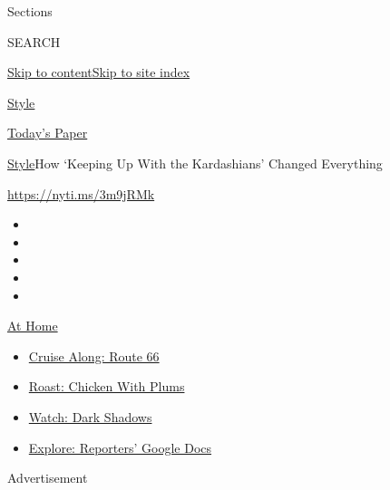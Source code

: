 Sections

SEARCH

\protect\hyperlink{site-content}{Skip to
content}\protect\hyperlink{site-index}{Skip to site index}

\href{https://www.nytimes3xbfgragh.onion/section/style}{Style}

\href{https://myaccount.nytimes3xbfgragh.onion/auth/login?response_type=cookie\&client_id=vi}{}

\href{https://www.nytimes3xbfgragh.onion/section/todayspaper}{Today's
Paper}

\href{/section/style}{Style}\textbar{}How `Keeping Up With the
Kardashians' Changed Everything

\url{https://nyti.ms/3m9jRMk}

\begin{itemize}
\item
\item
\item
\item
\item
\end{itemize}

\href{https://www.nytimes3xbfgragh.onion/spotlight/at-home?action=click\&pgtype=Article\&state=default\&region=TOP_BANNER\&context=at_home_menu}{At
Home}

\begin{itemize}
\tightlist
\item
  \href{https://www.nytimes3xbfgragh.onion/2020/09/07/travel/route-66.html?action=click\&pgtype=Article\&state=default\&region=TOP_BANNER\&context=at_home_menu}{Cruise
  Along: Route 66}
\item
  \href{https://www.nytimes3xbfgragh.onion/2020/09/04/dining/sheet-pan-chicken.html?action=click\&pgtype=Article\&state=default\&region=TOP_BANNER\&context=at_home_menu}{Roast:
  Chicken With Plums}
\item
  \href{https://www.nytimes3xbfgragh.onion/2020/09/04/arts/television/dark-shadows-stream.html?action=click\&pgtype=Article\&state=default\&region=TOP_BANNER\&context=at_home_menu}{Watch:
  Dark Shadows}
\item
  \href{https://www.nytimes3xbfgragh.onion/interactive/2020/at-home/even-more-reporters-editors-diaries-lists-recommendations.html?action=click\&pgtype=Article\&state=default\&region=TOP_BANNER\&context=at_home_menu}{Explore:
  Reporters' Google Docs}
\end{itemize}

Advertisement

